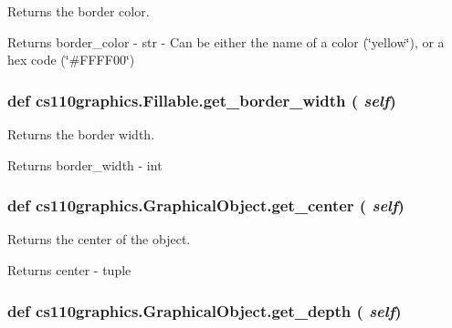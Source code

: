 Returns the border color. \begin{DoxyReturn}{Returns}
border\_\-color -\/ str -\/ Can be either the name of a color (\char`\"{}yellow\char`\"{}), or a hex code (\char`\"{}\#FFFF00\char`\"{}) 
\end{DoxyReturn}
\hypertarget{classcs110graphics_1_1Fillable_a6ed7a4288e84a090ec185c8bdff21d0f}{
\subsubsection[{get\_\-border\_\-width}]{\setlength{\rightskip}{0pt plus 5cm}def cs110graphics.Fillable.get\_\-border\_\-width ( {\em self})}}
\label{classcs110graphics_1_1Fillable_a6ed7a4288e84a090ec185c8bdff21d0f}


Returns the border width. \begin{DoxyReturn}{Returns}
border\_\-width -\/ int 
\end{DoxyReturn}
\hypertarget{classcs110graphics_1_1GraphicalObject_a062789c4cc9de38af32dcc4ff2058607}{
\subsubsection[{get\_\-center}]{\setlength{\rightskip}{0pt plus 5cm}def cs110graphics.GraphicalObject.get\_\-center ( {\em self})}}
\label{classcs110graphics_1_1GraphicalObject_a062789c4cc9de38af32dcc4ff2058607}


Returns the center of the object. \begin{DoxyReturn}{Returns}
center -\/ tuple 
\end{DoxyReturn}
\hypertarget{classcs110graphics_1_1GraphicalObject_a6d9f5718cd0cf249e0d2842971bae17f}{
\subsubsection[{get\_\-depth}]{\setlength{\rightskip}{0pt plus 5cm}def cs110graphics.GraphicalObject.get\_\-depth ( {\em self})}}
\label{classcs110graphics_1_1GraphicalObject_a6d9f5718cd0cf249e0d2842971bae17f}


